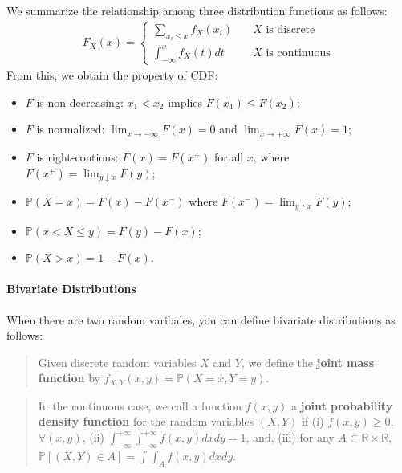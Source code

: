 \documentclass[
  12pt,
]{article}
\providecommand{\tightlist}{%
  \setlength{\itemsep}{0pt}\setlength{\parskip}{0pt}}
\begin{document}
We summarize the relationship among three distribution functions as follows:
\begin{align*}
  F_X(x) =
  \begin{cases}
    \sum_{x_i \le x} f_X(x_i)  &\quad\text{$X$ is discrete} \\
    \int_{-\infty}^x f_X(t)dt  &\quad\text{$X$ is continuous}
  \end{cases}
\end{align*}
From this, we obtain the property of CDF:

\begin{itemize}
\tightlist
\item
  \(F\) is non-decreasing: \(x_1 < x_2\) implies \(F(x_1) \le F(x_2)\);
\item
  \(F\) is normalized: \(\lim_{x \to -\infty} F(x) = 0\) and \(\lim_{x \to +\infty} F(x) = 1\);
\item
  \(F\) is right-contious: \(F(x) = F(x^+)\) for all \(x\), where \(F(x^+) = \lim_{y \downarrow x} F(y)\);
\item
  \(\mathbb{P}(X = x) = F(x) - F(x^-)\) where \(F(x^-) = \lim_{y \uparrow x} F(y)\);
\item
  \(\mathbb{P}(x < X \le y) = F(y) - F(x)\);
\item
  \(\mathbb{P}(X > x) = 1 - F(x)\).
\end{itemize}

\hypertarget{bivariate-distributions}{%
\paragraph{Bivariate Distributions}\label{bivariate-distributions}}

When there are two random varibales, you can define bivariate distributions as follows:

\begin{quote}
Given discrete random variables \(X\) and \(Y\), we define the \textbf{joint mass function} by \(f_{X,Y}(x, y) = \mathbb{P}(X = x, Y = y)\).
\end{quote}

\begin{quote}
In the continuous case, we call a function \(f(x, y)\) a \textbf{joint probability density function} for the random variables \((X, Y)\) if (i) \(f(x, y) \ge 0\), \(\forall (x, y)\), (ii) \(\int_{-\infty}^{+\infty} \int_{-\infty}^{+\infty} f(x, y)dx dy = 1\), and, (iii) for any \(A \subset \mathbb{R} \times \mathbb{R}\), \(\mathbb{P}[(X, Y) \in A] = \int \int_A f(x, y)dx dy\).
\end{quote}
\end{document}
